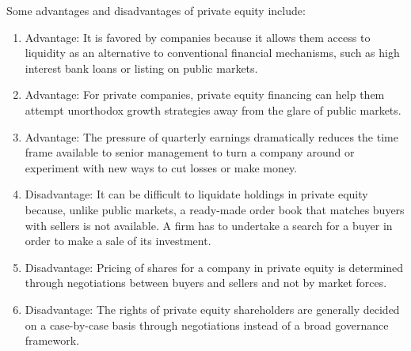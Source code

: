 \documentclass{article}
\begin{document}
    Some advantages and disadvantages of private equity include: 
    \begin{enumerate}
      \item Advantage: It is favored by companies because it allows them access to liquidity as an alternative to conventional financial mechanisms, such as high interest bank loans or listing on public markets. 
      \item Advantage: For private companies, private equity financing can help them attempt unorthodox growth strategies away from the glare of public markets. 
      \item Advantage: The pressure of quarterly earnings dramatically reduces the time frame available to senior management to turn a company around or experiment with new ways to cut losses or make money. 
      \item Disadvantage: It can be difficult to liquidate holdings in private equity because, unlike public markets, a ready-made order book that matches buyers with sellers is not available. A firm has to undertake a search for a buyer in order to make a sale of its investment. 
      \item Disadvantage: Pricing of shares for a company in private equity is determined through negotiations between buyers and sellers and not by market forces. 
      \item Disadvantage: The rights of private equity shareholders are generally decided on a case-by-case basis through negotiations instead of a broad governance framework. 
    \end{enumerate}
\end{document}
